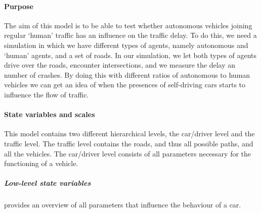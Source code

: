 \paragraph{Purpose}
\label{par:method:model:overview:purpose}
The aim of this model is to be able to test whether autonomous vehicles joining regular `human' traffic has an influence on the traffic delay. To do this, we need a simulation in which we have different types of agents, namely autonomous and `human' agents, and a set of roads. In our simulation, we let both types of agents drive over the roads, encounter intersections, and we  measure the delay an number of crashes. By doing this with different ratios of autonomous to human vehicles we can get an idea of when the presences of self-driving cars starts to influence the flow of traffic.

\paragraph{State variables and scales}
\label{par:method:model:overview:state}
This model contains two different hierarchical levels, the car/driver level and the traffic level. The traffic level contains the roads, and thus all possible paths, and all the vehicles. The car/driver level consists of all parameters necessary for the functioning of a vehicle.  


	\subparagraph{Low-level state variables}
	 provides an overview of all parameters that influence the behaviour of a car.


